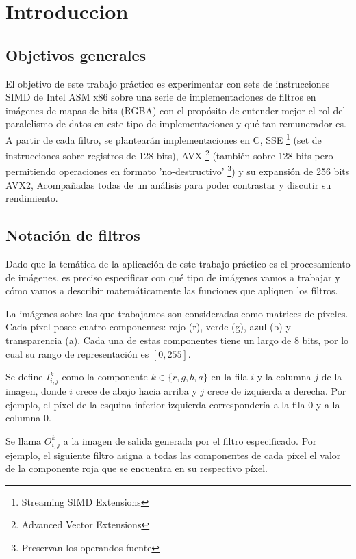 \section{Introduccion}

\subsection{Objetivos generales}

El objetivo de este trabajo práctico es experimentar con sets de instrucciones SIMD de Intel ASM x86 sobre una serie de implementaciones de filtros en imágenes de mapas de bits (RGBA) con el propósito de entender mejor el rol del paralelismo de datos en este tipo de implementaciones y qué tan remunerador es. 
A partir de cada filtro, se plantearán implementaciones en C, SSE \footnote{Streaming SIMD Extensions} (set de instrucciones sobre registros de 128 bits), AVX \footnote{Advanced Vector Extensions} (también sobre 128 bits pero permitiendo operaciones en formato 'no-destructivo' \footnote{Preservan los operandos fuente}) y su expansión de 256 bits AVX2, Acompañadas todas de un análisis para poder contrastar y discutir su rendimiento.

\subsection{Notación de filtros}

Dado que la temática de la aplicación de este trabajo práctico es el procesamiento de imágenes, es preciso especificar con qué tipo de imágenes vamos a trabajar y cómo vamos a describir matemáticamente las funciones que apliquen los filtros.

La imágenes sobre las que trabajamos son consideradas como matrices de píxeles. Cada píxel posee cuatro componentes: rojo (r), verde (g), azul (b) y transparencia (a). Cada una de estas componentes tiene un largo de 8 bits, por lo cual su rango de representación es $[0, 255]$.

Se define $I^k_{i,j}$ como la componente $k \in \{r,g,b,a\}$ en la fila $i$ y la columna $j$ de la imagen, donde $i$ crece de abajo hacia arriba y $j$ crece de izquierda a derecha. Por ejemplo, el píxel de la esquina inferior izquierda correspondería a la fila 0 y a la columna 0.

Se llama $O^k_{i,j}$ a la imagen de salida generada por el filtro especificado. Por ejemplo, el siguiente filtro asigna a todas las componentes de cada píxel el valor de la componente roja que se encuentra en su respectivo píxel.

